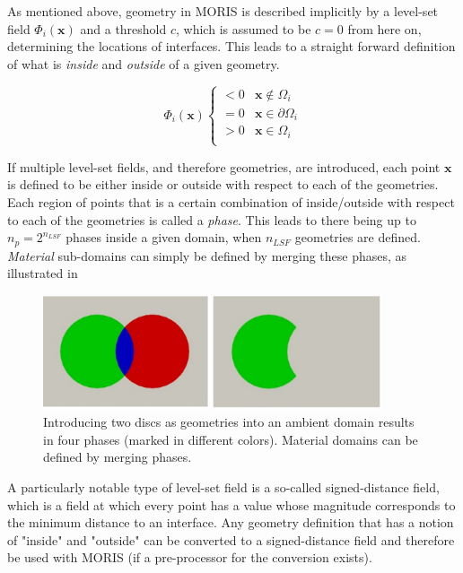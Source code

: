 As mentioned above, geometry in MORIS is described implicitly by a level-set field $\Phi_i(\bm{x})$ and a threshold $c$, which is assumed to be $c=0$ from here on, determining the locations of interfaces. 
This leads to a straight forward definition of what is \emph{inside} and \emph{outside} of a given geometry. 

\begin{equation}
\label{eq:level_set_field}
    \Phi_i(\bm{x}) 
    \begin{cases}
        < 0 & \bm{x} \notin \Omega_i \\
        = 0 & \bm{x} \in \partial\Omega_i \\
        > 0 & \bm{x} \in \Omega_i \\
    \end{cases}
\end{equation}

\hypertarget{phase_assignment}{}
If multiple level-set fields, and therefore geometries, are introduced, each point $\bm{x}$ is defined to be either inside or outside with respect to each of the geometries. Each region of points that is a certain combination of inside/outside with respect to each of the geometries is called a \emph{phase}. This leads to there being up to $n_p = 2^{n_{LSF}}$ phases inside a given domain, when $n_{LSF}$ geometries are defined. \emph{Material} sub-domains can simply be defined by merging these phases, as illustrated in 

\begin{figure}[h]
    \begin{center}
    \includegraphics[width=10cm]{Figures/phase_merging.png}
    \caption{Introducing two discs as geometries into an ambient domain results in four phases (marked in different colors). Material domains can be defined by merging phases. } 
    \label{fig:phase_mergin}
    \end{center}
\end{figure}

A particularly notable type of level-set field is a so-called signed-distance field, which is a field at which every point has a value whose magnitude corresponds to the minimum distance to an interface.
Any geometry definition that has a notion of "inside" and "outside" can be converted to a signed-distance field and therefore be used with MORIS (if a pre-processor for the conversion exists).

